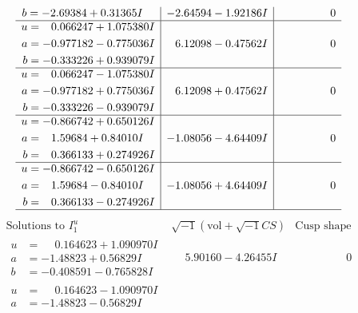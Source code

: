 \documentclass[1p]{elsarticle_modified}
\theoremstyle{definition}
\newcommand{\I}{\sqrt{-1}}
\begin{document}
$$\begin{array}{c|c|c}
\begin{aligned}
b &= -2.69384 + 0.31365 I\end{aligned}
 & -2.64594 - 1.92186 I & \phantom{-0.000000 } 0 \\ \hline\begin{aligned}
u &= \phantom{-}0.066247 + 1.075380 I \\
a &= -0.977182 - 0.775036 I \\
b &= -0.333226 + 0.939079 I\end{aligned}
 & \phantom{-}6.12098 - 0.47562 I & \phantom{-0.000000 } 0 \\ \hline\begin{aligned}
u &= \phantom{-}0.066247 - 1.075380 I \\
a &= -0.977182 + 0.775036 I \\
b &= -0.333226 - 0.939079 I\end{aligned}
 & \phantom{-}6.12098 + 0.47562 I & \phantom{-0.000000 } 0 \\ \hline\begin{aligned}
u &= -0.866742 + 0.650126 I \\
a &= \phantom{-}1.59684 + 0.84010 I \\
b &= \phantom{-}0.366133 + 0.274926 I\end{aligned}
 & -1.08056 - 4.64409 I & \phantom{-0.000000 } 0 \\ \hline\begin{aligned}
u &= -0.866742 - 0.650126 I \\
a &= \phantom{-}1.59684 - 0.84010 I \\
b &= \phantom{-}0.366133 - 0.274926 I\end{aligned}
 & -1.08056 + 4.64409 I & \phantom{-0.000000 } 0\\
 \hline 
 \end{array}$$\newpage$$\begin{array}{c|c|c}  
\text{Solutions to }I^u_{1}& \I (\text{vol} + \sqrt{-1}CS) & \text{Cusp shape}\\
 \hline 
\begin{aligned}
u &= \phantom{-}0.164623 + 1.090970 I \\
a &= -1.48823 + 0.56829 I \\
b &= -0.408591 - 0.765828 I\end{aligned}
 & \phantom{-}5.90160 - 4.26455 I & \phantom{-0.000000 } 0 \\ \hline\begin{aligned}
u &= \phantom{-}0.164623 - 1.090970 I \\
a &= -1.48823 - 0.56829 I \\

\end{aligned}
\end{array}$$
\end{document}
